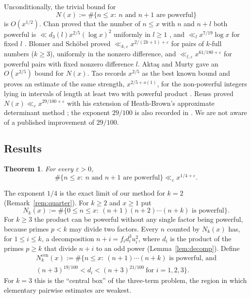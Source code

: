 \documentclass[11pt,reqno]{amsart}
\newtheorem{theorem}{Theorem}[section]
\theoremstyle{definition}
\theoremstyle{remark}
\numberwithin{equation}{section}
\newcommand{\Ncen}{N_k^{\mathrm{cen}}}
\begin{document}
Unconditionally, the trivial bound for
\[
N(x):=\#\{n\le x:\ n\text{ and }n+1\text{ are powerful}\}
\]
is $O(x^{1/2})$. Chan \cite{Chan2012} proved that the number of $n\le x$ with
$n$ and $n+l$ both powerful is $\ll d_3(l)x^{2/5}(\log x)^2$ uniformly in
$l\ge1$ \cite[Theorem~3]{Chan2012}, and $\ll_l x^{7/19}\log x$ for fixed $l$
\cite[Theorem~4]{Chan2012}. Blomer and Sch\"obel
\cite[Theorems~1 and~3]{BlomerSchobel} proved
$\ll_{k,\varepsilon}x^{2/(2k+1)+\varepsilon}$ for pairs of $k$-full numbers
($k\ge3$), uniformly in the nonzero difference, and
$\ll_{l,\varepsilon}x^{61/180+\varepsilon}$ for powerful pairs with fixed
nonzero difference $l$. Akta\c{s} and Murty \cite{AktasMurty} gave
an $O(x^{2/5})$ bound for $N(x)$. Tao records
$x^{2/5}$ as the best known bound \cite[(1.16)]{Tao} and proves an estimate of
the same strength, $x^{2/5+o(1)}$, for the non-powerful integers lying in
intervals of length at least two with powerful product
\cite[Theorem~1.8]{Tao}. Reuss \cite[Theorem~4]{Reuss} proved
$N(x)\ll_\varepsilon x^{29/100+\varepsilon}$ with his extension of
Heath-Brown's approximate determinant method \cite{HBsqfree,HBAnnals}; the
exponent $29/100$ is also recorded in \cite{WongcharoenbhornMeemark}. We are
not aware of a published improvement of $29/100$.

\subsection{Results}
\begin{theorem}\label{thm:k2}
For every $\varepsilon>0$,
\[
\#\{n\le x:\ n\text{ and }n+1\text{ are powerful}\}\ll_\varepsilon x^{1/4+\varepsilon}.
\]
\end{theorem}

The exponent $1/4$ is the exact limit of our method for $k=2$
(Remark~\ref{rem:quarter}). For $k\ge2$ and $x\ge1$ put
\[
N_k(x):=\#\{0\le n\le x:\ (n+1)(n+2)\cdots(n+k)\text{ is powerful}\}.
\]
For $k\ge3$ the product can be powerful without any single factor being
powerful, because primes $p<k$ may divide two factors. Every $n$ counted by
$N_k(x)$ has, for $1\le i\le k$, a decomposition $n+i=f_id_i^3u_i^2$, where
$d_i$ is the product of the primes $p\ge k$ that divide $n+i$ to an odd power
(Lemma~\ref{lem:decomp}). Define
\begin{multline*}
\Ncen(x):=\#\{n\le x:\ (n+1)\cdots(n+k)\text{ is powerful, and}\\
(n+3)^{19/100}<d_i<(n+3)^{21/100}\ \text{for } i=1,2,3\}.
\end{multline*}
For $k=3$ this is the ``central box'' of the three-term problem, the region in
which elementary pairwise estimates are weakest.
\end{document}
